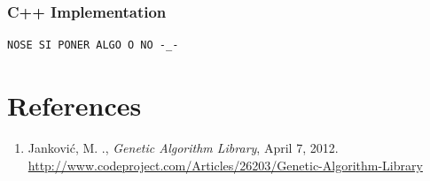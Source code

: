 \documentclass{beamer}%
\begin{document}
\begin{frame}[fragile]
\frametitle{C++ Implementation}
\lstset{language=C++}
\begin{lstlisting}
NOSE SI PONER ALGO O NO -_-
\end{lstlisting}
\end{frame}



\section{References}

\begin{frame}
\begin{enumerate} 
\item Janković, M. ., \textit{Genetic Algorithm Library}, April 7, 2012. \url{http://www.codeproject.com/Articles/26203/Genetic-Algorithm-Library}
\end{enumerate}
\end{frame}
\end{document}
